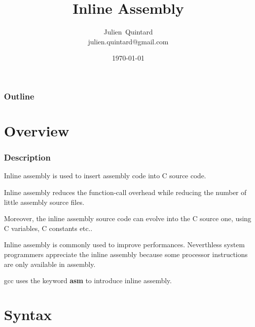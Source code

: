 \documentclass[8pt]{beamer}
\title{Inline Assembly}
\author
{
  Julien~Quintard\inst{1} \\
  {\tiny julien.quintard@gmail.com}
}
\institute
{
  \inst{1} kaneton distributed operating system project
}
\date{\today}
\newcommand{\nl}[0]{\vspace{0.4cm}}
\begin{document}
%
%

\begin{frame}
  \titlepage

  \begin{center}
     \hspace{0.1cm}  \hspace{0.1cm}
     \hspace{0.1cm}
  \end{center}
\end{frame}

%
%

\begin{frame}
  \frametitle{Outline}
  \tableofcontents
\end{frame}

%
%

\section{Overview}


\begin{frame}
  \frametitle{Description}

  Inline assembly is used to insert assembly code into C source code.

  \nl

  Inline assembly reduces the function-call overhead while reducing
  the number of little assembly source files.

  \nl

  Moreover, the inline assembly source code can evolve into the C
  source one, using C variables, C constants etc..

  \nl

  Inline assembly is commonly used to improve performances. Neverthless
  system programmers appreciate the inline assembly because some
  processor instructions are only available in assembly.

  \nl

  gcc uses the keyword \textbf{asm} to introduce inline assembly.
\end{frame}

%
%

\section{Syntax}

\end{document}
